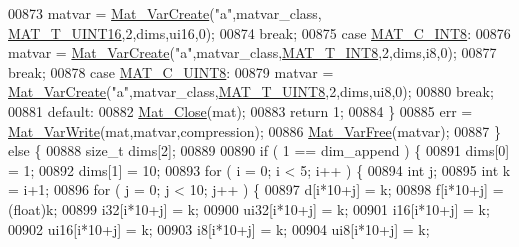 \begin{DoxyCode}
{{{00873                 matvar = \hyperlink{group___m_a_t_ga1c54a84bb4d810c6fccdb8869489eac4}{Mat\_VarCreate}(\textcolor{stringliteral}{"a"},matvar\_class,
      \hyperlink{group___m_a_t_ggacf7b3b879282b7ab3a51190e49bf3453a05bc7af7680aa68be95126ae0a4c2e31}{MAT\_T\_UINT16},2,dims,ui16,0);
00874                 \textcolor{keywordflow}{break};
00875             \textcolor{keywordflow}{case} \hyperlink{group___m_a_t_ggad4d60ae7b709fc81bfd744fb4c857c40a984ff310f9e906100fcff95f704f43c5}{MAT\_C\_INT8}:
00876                 matvar = \hyperlink{group___m_a_t_ga1c54a84bb4d810c6fccdb8869489eac4}{Mat\_VarCreate}(\textcolor{stringliteral}{"a"},matvar\_class,\hyperlink{group___m_a_t_ggacf7b3b879282b7ab3a51190e49bf3453a9807f5033ed4f9b548953742d9fd1658}{MAT\_T\_INT8},2,dims,i8,0);
00877                 \textcolor{keywordflow}{break};
00878             \textcolor{keywordflow}{case} \hyperlink{group___m_a_t_ggad4d60ae7b709fc81bfd744fb4c857c40a81270f8093cb4808e992c1d29d84d4e3}{MAT\_C\_UINT8}:
00879                 matvar = \hyperlink{group___m_a_t_ga1c54a84bb4d810c6fccdb8869489eac4}{Mat\_VarCreate}(\textcolor{stringliteral}{"a"},matvar\_class,\hyperlink{group___m_a_t_ggacf7b3b879282b7ab3a51190e49bf3453a01c1bd7db68f90552862eb5d311be408}{MAT\_T\_UINT8},2,dims,ui8,0);
00880                 \textcolor{keywordflow}{break};
00881             \textcolor{keywordflow}{default}:
00882                 \hyperlink{group___m_a_t_ga101c92ff7bde4a2d4615661beba09262}{Mat\_Close}(mat);
00883                 \textcolor{keywordflow}{return} 1;
00884         \}
00885         err = \hyperlink{group___m_a_t_ga4bd3eba12df415d8226e27c457fbbb0b}{Mat\_VarWrite}(mat,matvar,compression);
00886         \hyperlink{group___m_a_t_ga1d14716f7450530fd1c9d02413787f0e}{Mat\_VarFree}(matvar);
00887     \} \textcolor{keywordflow}{else} \{
00888         \textcolor{keywordtype}{size\_t} dims[2];
00889 
00890         \textcolor{keywordflow}{if} ( 1 == dim\_append ) \{
00891             dims[0] = 1;
00892             dims[1] = 10;
00893             \textcolor{keywordflow}{for} ( i = 0; i < 5; i++ ) \{
00894                 \textcolor{keywordtype}{int} j;
00895                 \textcolor{keywordtype}{int} k = i+1;
00896                 \textcolor{keywordflow}{for} ( j = 0; j < 10; j++ ) \{
00897                       d[i*10+j] = k;
00898                       f[i*10+j] = (float)k;
00899                     i32[i*10+j] = k;
00900                    ui32[i*10+j] = k;
00901                     i16[i*10+j] = k;
00902                    ui16[i*10+j] = k;
00903                      i8[i*10+j] = k;
00904                     ui8[i*10+j] = k;
}}}
\end{DoxyCode}
